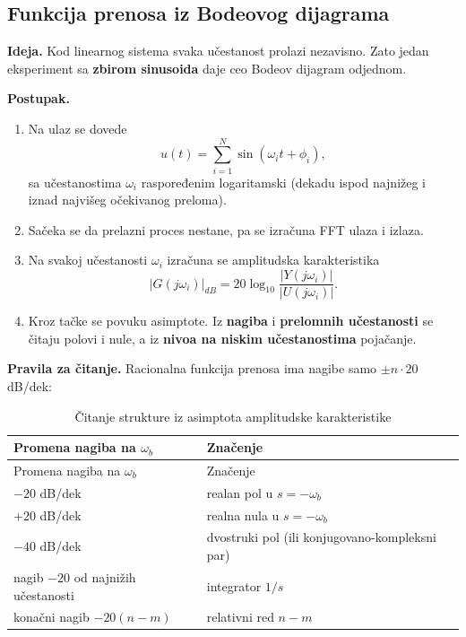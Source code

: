 \documentclass[11pt,a4paper,parskip=half,headsepline,numbers=noenddot]{scrartcl}
\begin{document}
\subsection{Funkcija prenosa iz Bodeovog dijagrama}

\textbf{Ideja.} Kod linearnog sistema svaka učestanost prolazi nezavisno. Zato jedan eksperiment sa \textbf{zbirom sinusoida} daje ceo Bodeov dijagram odjednom.

\textbf{Postupak.}

\begin{enumerate}
\def\labelenumi{\arabic{enumi}.}
\item Na ulaz se dovede
  \[u(t) = \sum_{i=1}^{N}\sin(\omega_i t + \phi_i),\]
  sa učestanostima \(\omega_i\) raspoređenim logaritamski (dekadu ispod najnižeg i iznad najvišeg očekivanog preloma).
\item Sačeka se da prelazni proces nestane, pa se izračuna FFT ulaza i izlaza.
\item Na svakoj učestanosti \(\omega_i\) izračuna se amplitudska karakteristika
  \[|G(j\omega_i)|_{dB} = 20\log_{10}\frac{|Y(j\omega_i)|}{|U(j\omega_i)|}.\]
\item Kroz tačke se povuku asimptote. Iz \textbf{nagiba} i \textbf{prelomnih učestanosti} se čitaju polovi i nule, a iz \textbf{nivoa na niskim učestanostima} pojačanje.
\end{enumerate}

\textbf{Pravila za čitanje.} Racionalna funkcija prenosa ima nagibe samo \(\pm n\cdot 20\) dB/dek:

\begin{longtable}[]{@{}ll@{}}
\caption{Čitanje strukture iz asimptota amplitudske karakteristike}\tabularnewline
\toprule\noalign{}
Promena nagiba na \(\omega_b\) & Značenje \\
\midrule\noalign{}
\endfirsthead
\toprule\noalign{}
Promena nagiba na \(\omega_b\) & Značenje \\
\midrule\noalign{}
\endhead
\bottomrule\noalign{}
\endlastfoot
\(-20\) dB/dek & realan pol u \(s = -\omega_b\) \\
\(+20\) dB/dek & realna nula u \(s = -\omega_b\) \\
\(-40\) dB/dek & dvostruki pol (ili konjugovano-kompleksni par) \\
nagib \(-20\) od najnižih učestanosti & integrator \(1/s\) \\
konačni nagib \(-20(n-m)\) & relativni red \(n - m\) \\
\end{longtable}
\end{document}
